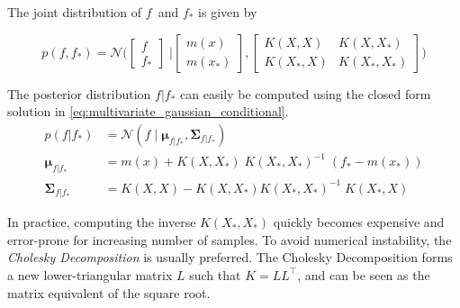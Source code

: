 The joint distribution of $f$ and $f_*$ is given by 

\begin{equation}
    p(f, f_*) = \mathcal{N}\bigg(\begin{bmatrix}
        f \\ f_*
    \end{bmatrix} \; \bigg| \begin{bmatrix}
        m(x) \\ m(x_*)
    \end{bmatrix},  \begin{bmatrix}
        K(X, X) & K(X, X_*) \\ K(X_*, X) & K(X_*, X_*)
    \end{bmatrix}\bigg)
\end{equation}

The posterior distribution $f | f_*$ can easily be computed using the closed form solution in \cref{eq:multivariate_gaussian_conditional}.
\begin{subequations}
\begin{align}
    p(f | f_*) &= \mathcal{N}(f \; | \; \boldsymbol{\mu}_{f|f_*}, \boldsymbol{\Sigma}_{f|f_*})\\
    \boldsymbol{\mu}_{f|f_*} &= m(x) + K(X, X_*) \; K(X_*, X_*)^{-1} \; (f_* - m(x_*))\\
    \boldsymbol{\Sigma}_{f|f_*} &= K(X, X) - K(X, X_*)  K(X_*, X_*)^{-1} \; K(X_*, X)
\end{align}
\end{subequations}

In practice, computing the inverse $K(X_*, X_*)$ quickly becomes expensive and error-prone for increasing number of samples. To avoid numerical instability, the \textit{Cholesky Decomposition} is usually preferred. The Cholesky Decomposition forms a new lower-triangular matrix $L$ such that $K = L L^\intercal$, and can be seen as the matrix equivalent of the square root.

